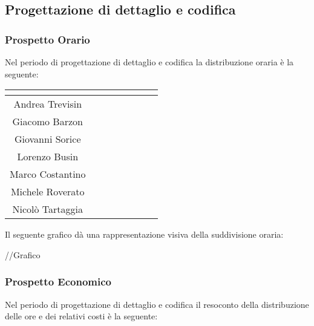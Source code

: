 \subsection{Progettazione di dettaglio e codifica}

\subsubsection{Prospetto Orario}
Nel periodo di progettazione di dettaglio e codifica la distribuzione oraria è la seguente:

\begin{center}
\renewcommand{\arraystretch}{1.5}
\begin{tabular}{|c|c|c|c|c|c|c|c|}
\hline
\rowcolor{title_row}
\textbf{\color{title_text}{Nome}} & \textbf{\color{title_text}{Resp.}} & \textbf{\color{title_text}{Ammi.}} & \textbf{\color{title_text}{Analist.}} & \textbf{\color{title_text}{Progett.}} & \textbf{\color{title_text}{Program.}} & \textbf{\color{title_text}{Verific.}} & \textbf{\color{title_text}{Totale}} \\ \hline
Andrea Trevisin  & & & & & & &  \\ \hline
Giacomo Barzon   & & & & & & &  \\ \hline
Giovanni Sorice  & & & & & & &  \\ \hline
Lorenzo Busin    & & & & & & &  \\ \hline
Marco Costantino & & & & & & &  \\ \hline
Michele Roverato & & & & & & &  \\ \hline
Nicolò Tartaggia & & & & & & &  \\ \hline
\end{tabular}
\renewcommand{\arraystretch}{1}
\end{center}

Il seguente grafico dà una rappresentazione visiva della suddivisione oraria: \\
\begin{center}
//Grafico
\end{center}


\subsubsection{Prospetto Economico}
Nel periodo di progettazione di dettaglio e codifica il resoconto della distribuzione delle ore e dei relativi costi è la seguente:

